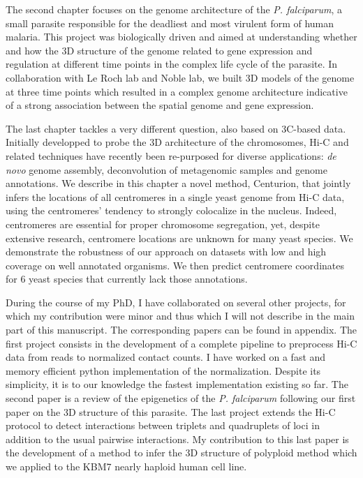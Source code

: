 \begin{abstracts}
The second chapter focuses on the genome architecture of the {\em P.
falciparum}, a small parasite responsible for the deadliest and most virulent
form of human malaria. This project was biologically driven and aimed at
understanding whether and how the 3D structure of the genome related to gene
expression and regulation at different time points in the complex life cycle
of the parasite. In collaboration with Le Roch lab and Noble lab, we built 3D
models of the genome at three time points which resulted in a complex genome
architecture indicative of a strong association between the spatial genome and
gene expression.

The last chapter tackles a very different question, also based on 3C-based
data. Initially developped to probe the 3D architecture of the chromosomes,
Hi-C and related techniques have recently been re-purposed for diverse
applications: \textit{de novo} genome assembly, deconvolution of metagenomic
samples and genome annotations. We describe in this chapter a novel method,
Centurion, that jointly infers the locations of all centromeres in a single yeast
genome from Hi-C data, using the centromeres' tendency to strongly colocalize
in the nucleus.  Indeed, centromeres are essential for proper chromosome
segregation, yet, despite extensive research, centromere locations are unknown
for many yeast species. We demonstrate the robustness of our approach on
datasets with low and high coverage on well annotated organisms. We then
predict centromere coordinates for 6 yeast species that currently lack those
annotations.

During the course of my PhD, I have collaborated on several other projects,
for which my contribution were minor and thus which I will not describe in the
main part of this manuscript. The corresponding papers can be found in
appendix. The first project consists in the development of a complete pipeline
to preprocess Hi-C data from reads to normalized contact counts. I have worked
on a fast and memory efficient python implementation of the normalization.
Despite its simplicity, it is to our
knowledge the fastest implementation existing so far. The second paper is a
review of the epigenetics of the {\em P. falciparum} following our first paper
on the 3D structure of this parasite. The last project extends the Hi-C
protocol to detect interactions between triplets and quadruplets of loci in
addition to the usual pairwise interactions. My contribution to this last paper
is the development of a method to infer the 3D structure of polyploid method
which we applied to the KBM7 nearly haploid human cell line.


\end{abstracts}


